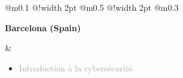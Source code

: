 \documentclass{article}
\begin{document}
\thispagestyle{international_experiences}

\vspace*{2cm}

\begin{tabular}
    {
        @{}m{}
        @{\hspace{0.001\textwidth}}!{\color{secondaryBlue}\vline width 2pt} %
        @{}m{0.5\textwidth}
        @{\hspace{0.025\textwidth}}!{\color{secondaryBlue}\vline width 2pt} %
        @{{\hspace{0.001\textwidth}}}m{0.3\textwidth}
    }
    \textcolor{secondaryBlue}
    {
        \begin{center}
            \textbf{Barcelona (Spain)}
        \end{center}
    } 

    &
    \begin{itemize}
        [label={}, topsep=8pt, partopsep=0pt, itemsep=0.5pt, parsep=2pt,after=\vspace*{-\baselineskip}]
        \setlength{\itemsep}{10pt}
        \item \textcolor{darkGray}{Introduction à la cybersécurité}
        \begin{itemize}
        [label={\textcolor{gray!100}{\checkmark}}, topsep=8pt, partopsep=0pt, itemsep=0.5pt, parsep=2pt, after=\vspace*{-\baselineskip}] 


\end{itemize}
\end{itemize}
\end{tabular}
\end{document}
